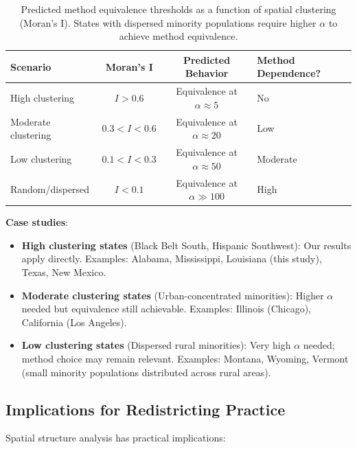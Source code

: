 \begin{table}[h]
\centering
\begin{tabular}{lccl}
\toprule
\textbf{Scenario} & \textbf{Moran's I} & \textbf{Predicted Behavior} & \textbf{Method Dependence?} \\
\midrule
High clustering & $I > 0.6$ & Equivalence at $\alpha \approx 5$ & No \\
Moderate clustering & $0.3 < I < 0.6$ & Equivalence at $\alpha \approx 20$ & Low \\
Low clustering & $0.1 < I < 0.3$ & Equivalence at $\alpha \approx 50$ & Moderate \\
Random/dispersed & $I < 0.1$ & Equivalence at $\alpha \gg 100$ & High \\
\bottomrule
\end{tabular}
\caption{Predicted method equivalence thresholds as a function of spatial clustering (Moran's I). States with dispersed minority populations require higher $\alpha$ to achieve method equivalence.}
\label{tab:generalization-supp}
\end{table}

\textbf{Case studies}:
\begin{itemize}
    \item \textbf{High clustering states} (Black Belt South, Hispanic Southwest): Our results apply directly. Examples: Alabama, Mississippi, Louisiana (this study), Texas, New Mexico.

    \item \textbf{Moderate clustering states} (Urban-concentrated minorities): Higher $\alpha$ needed but equivalence still achievable. Examples: Illinois (Chicago), California (Los Angeles).

    \item \textbf{Low clustering states} (Dispersed rural minorities): Very high $\alpha$ needed; method choice may remain relevant. Examples: Montana, Wyoming, Vermont (small minority populations distributed across rural areas).
\end{itemize}

\subsection{Implications for Redistricting Practice}

Spatial structure analysis has practical implications:

